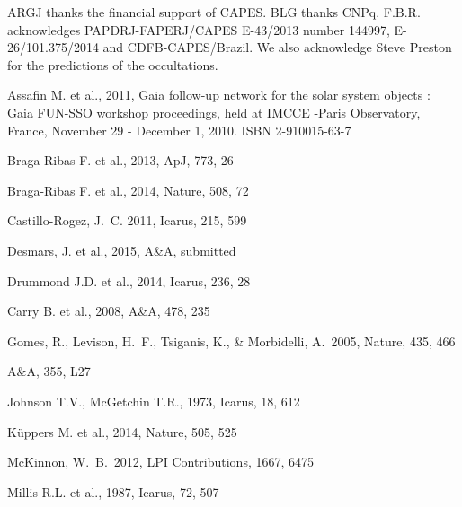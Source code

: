 \documentclass[useAMS,usenatbib]{mn2e}
\begin{document}
ARGJ thanks the financial support of CAPES. BLG thanks CNPq. F.B.R. acknowledges PAPDRJ-FAPERJ/CAPES E-43/2013 number 144997, E-26/101.375/2014 and CDFB-CAPES/Brazil. We also acknowledge Steve Preston for the predictions of the occultations.


\begin{thebibliography}{99}

 Assafin M. et al., 2011, Gaia follow-up network for the solar system objects : Gaia FUN-SSO workshop proceedings, held at IMCCE -Paris Observatory, France, November 29 - December 1, 2010. ISBN 2-910015-63-7

 Braga-Ribas F. et al., 2013,
ApJ, 773, 26

 Braga-Ribas F. et al., 2014,
Nature, 508, 72

 Castillo-Rogez, J.~C. 
2011, Icarus, 215, 599 

 Desmars, J. et al., 2015, A\&A, submitted

 Drummond J.D. et al., 2014,
Icarus, 236, 28

 Carry B. et al., 2008,
A\&A, 478, 235

 Gomes, R., Levison, H.~F., Tsiganis, K., \& Morbidelli, A.\ 2005, Nature, 435, 466 

A\&A, 355, L27

 Johnson T.V., McGetchin T.R., 1973,
Icarus, 18, 612

 K\"{u}ppers M. et al., 2014,
Nature, 505, 525

 McKinnon, W.~B.\ 2012, LPI 
Contributions, 1667, 6475 

 Millis R.L. et al., 1987,
Icarus, 72, 507


\end{thebibliography}
\end{document}
